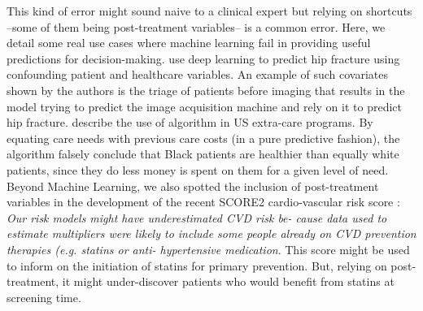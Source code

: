 \documentclass[10pt,letterpaper]{article}
\begin{document}
This kind of error might sound naive to a clinical expert but relying on
shortcuts --some of them being post-treatment variables-- is a common error.
Here, we detail some real use cases where machine learning fail in providing
useful predictions for decision-making. \cite{badgeley2019deep} use deep
learning to predict hip fracture using confounding patient and healthcare
variables. An example of such covariates shown by the authors is the triage of
patients before imaging that results in the model trying to predict the image
acquisition machine and rely on it to predict hip fracture.
\cite{obermeyer2019dissecting} describe the use of algorithm in US extra-care
programs. By equating care needs with previous care costs (in a pure
predictive fashion), the algorithm falsely conclude that Black patients are
healthier than equally white patients, since they do less money is spent on
them for a given level of need. Beyond Machine Learning, we also spotted the
inclusion of post-treatment variables in the development of the recent SCORE2
cardio-vascular risk score \cite{score22021score2}: \emph{Our risk models
    might have underestimated CVD risk be- cause data used to estimate multipliers
    were likely to include some people already on CVD prevention therapies (e.g.
    statins or anti- hypertensive medication}. This score might be used to inform
on the initiation of statins for primary prevention. But, relying on
post-treatment, it might under-discover patients who would benefit from
statins at screening time.
\end{document}
